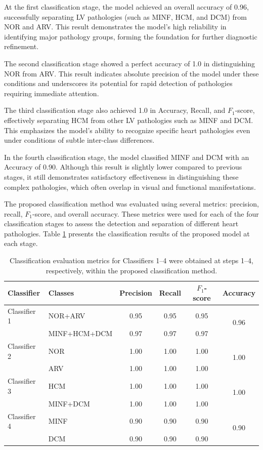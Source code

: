 \documentclass[fleqn,10pt]{wlscirep}
\begin{document}
At the first classification stage, the model achieved an overall accuracy of 0.96, successfully separating LV pathologies (such as MINF, HCM, and DCM) from NOR and ARV. This result demonstrates the model’s high reliability in identifying major pathology groups, forming the foundation for further diagnostic refinement.

The second classification stage showed a perfect accuracy of 1.0 in distinguishing NOR from ARV. This result indicates absolute precision of the model under these conditions and underscores its potential for rapid detection of pathologies requiring immediate attention.

The third classification stage also achieved 1.0 in Accuracy, Recall, and \({F_1}\)-score, effectively separating HCM from other LV pathologies such as MINF and DCM. This emphasizes the model’s ability to recognize specific heart pathologies even under conditions of subtle inter-class differences.

In the fourth classification stage, the model classified MINF and DCM with an Accuracy of 0.90. Although this result is slightly lower compared to previous stages, it still demonstrates satisfactory effectiveness in distinguishing these complex pathologies, which often overlap in visual and functional manifestations.

The proposed classification method was evaluated using several metrics: precision, recall, \({F_1}\)-score, and overall accuracy. These metrics were used for each of the four classification stages to assess the detection and separation of different heart pathologies. Table \ref{tab:cascade_classification_metrics} presents the classification results of the proposed model at each stage.

\begin{table}[ht]
\centering
\caption{Classification evaluation metrics for Classifiers 1–4 were obtained at steps 1–4, respectively, within the proposed classification method.}
\label{tab:cascade_classification_metrics}
\begin{tabular}{l lcccc}
\toprule
\textbf{Classifier} & \textbf{Classes} & \textbf{Precision} & \textbf{Recall} & \textbf{\({F_1}\)-score} & \textbf{Accuracy} \\
\midrule
Classifier 1 & NOR+ARV & 0.95 & 0.95 & 0.95 & \multirow{2}{*}{0.96} \\
 & MINF+HCM+DCM & 0.97 & 0.97 & 0.97 &  \\
\midrule
Classifier 2 & NOR & 1.00 & 1.00 & 1.00 & \multirow{2}{*}{1.00} \\
 & ARV & 1.00 & 1.00 & 1.00 &  \\
\midrule
Classifier 3 & HCM & 1.00 & 1.00 & 1.00 & \multirow{2}{*}{1.00} \\
 & MINF+DCM & 1.00 & 1.00 & 1.00 &  \\
\midrule
Classifier 4 & MINF & 0.90 & 0.90 & 0.90 & \multirow{2}{*}{0.90} \\
 & DCM & 0.90 & 0.90 & 0.90 &  \\
\bottomrule
\end{tabular}
\end{table}
\end{document}
